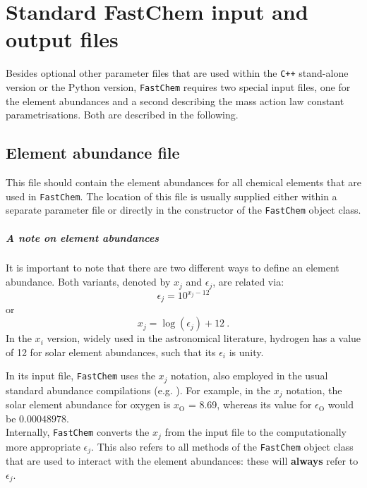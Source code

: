 \documentclass[numbers=noenddot]{fcmanual}
\newcommand{\fc}{\texttt{FastChem}\xspace}
\newcommand{\cpp}{\ttt{C++}\xspace}
\newcommand{\ttt}[1]{\texttt {#1}}
\begin{document}
\chapter{Standard FastChem input and output files}
\label{sec:fastchem_input_files}

Besides optional other parameter files that are used within the \cpp stand-alone version or the Python version, \fc requires two special input files, one for the element abundances and a second describing the mass action law constant parametrisations. Both are described in the following.

\section{Element abundance file}

This file should contain the element abundances for all chemical elements that are used in \fc. The location of this file is usually supplied either within a separate parameter file or directly in the constructor of the \fc object class.

\paragraph{A note on element abundances}
It is important to note that there are two different ways to define an element abundance. Both variants, denoted by $x_j$ and $\epsilon_j$, are related via:
\begin{equation}
\epsilon_j = 10^{x_j - 12}
\end{equation}
or
\begin{equation}
 x_j = \log\left(\epsilon_j\right) + 12 \ .
\end{equation}
In the $x_i$ version, widely used in the astronomical literature, hydrogen has a value of 12 for solar element abundances, such that its $\epsilon_i$ is unity. 

In its input file, \fc uses the $x_j$ notation, also employed in the usual standard abundance compilations (e.g. \citet{Asplund2009ARA&A..47..481A}). For example, in the $x_j$ notation, the solar element abundance for oxygen is $x_\mathrm{O}$ = 8.69, whereas its value for $\epsilon_\mathrm{O}$ would be $0.00048978$.\\

Internally, \fc converts the $x_j$ from the input file to the computationally more appropriate $\epsilon_j$. This also refers to all methods of the \fc object class that are used to interact with the element abundances: these will \textbf{always} refer to $\epsilon_j$. 
\end{document}
